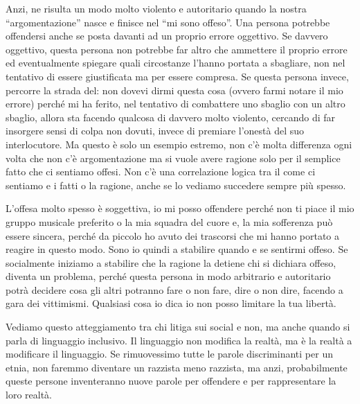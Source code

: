 \documentclass[12pt]{book} %
\begin{document}
Anzi, ne risulta un modo molto violento e autoritario quando la nostra “argomentazione” nasce e finisce nel “mi sono
offeso”. Una persona potrebbe offendersi anche se posta davanti ad un proprio errore oggettivo. Se davvero oggettivo,
questa persona non potrebbe far altro che ammettere il proprio errore ed eventualmente spiegare quali circostanze
l'hanno portata a sbagliare, non nel tentativo di essere giustificata ma per essere compresa. Se
questa persona invece, percorre la strada del: non dovevi dirmi questa cosa (ovvero farmi notare il mio errore) perché
mi ha ferito, nel tentativo di combattere uno sbaglio con un altro sbaglio, allora sta facendo qualcosa di davvero
molto violento, cercando di far insorgere sensi di colpa non dovuti, invece di premiare l'onestà
del suo interlocutore. Ma questo è solo un esempio estremo, non c'è molta differenza ogni volta
che non c'è argomentazione ma si vuole avere ragione solo per il semplice fatto che ci sentiamo
offesi. Non c'è una correlazione logica tra il come ci sentiamo e i fatti o la ragione, anche se
lo vediamo succedere sempre più spesso.


\bigskip

L'offesa molto spesso è soggettiva, io mi posso offendere perché non ti piace il mio gruppo musicale preferito o la mia
squadra del cuore e, la mia sofferenza può essere sincera, perché da piccolo ho avuto dei trascorsi che mi hanno
portato a reagire in questo modo. Sono io quindi a stabilire quando e se sentirmi offeso. Se socialmente iniziamo a
stabilire che la ragione la detiene chi si dichiara offeso, diventa un problema, perché questa persona in modo
arbitrario e autoritario potrà decidere cosa gli altri potranno fare o non fare, dire o non dire, facendo a gara dei
vittimismi. Qualsiasi cosa io dica io non posso limitare la tua libertà.

Vediamo questo atteggiamento tra chi litiga sui social e non, ma anche quando si parla di linguaggio inclusivo. Il
linguaggio non modifica la realtà, ma è la realtà a modificare il linguaggio. Se rimuovessimo tutte le parole
discriminanti per un etnia, non faremmo diventare un razzista meno razzista, ma anzi, probabilmente queste persone
inventeranno nuove parole per offendere e per rappresentare la loro realtà.


\bigskip
\end{document}
